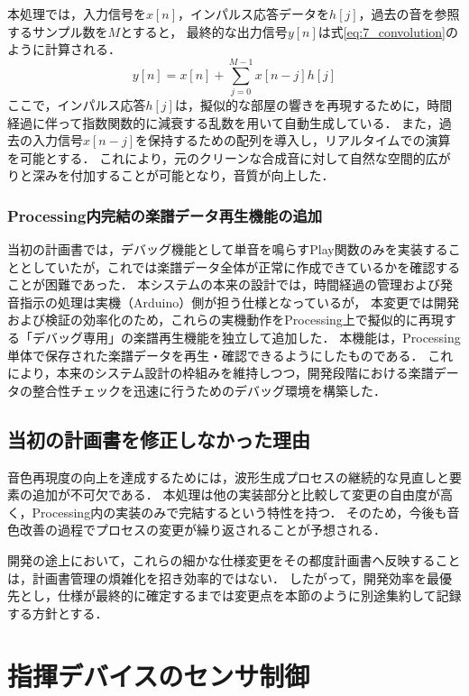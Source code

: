 \documentclass[lualatex,book,paper=a4paper,jafontsize=11.5pt,jafontscale=1.05]{jlreq}
\begin{document}
本処理では，入力信号を$x[n]$，インパルス応答データを$h[j]$，過去の音を参照するサンプル数を$M$とすると，
最終的な出力信号$y[n]$は式\ref{eq:7_convolution}のように計算される．
\begin{equation}
  y[n] = x[n] + \sum_{j=0}^{M-1} x[n-j] h[j] \label{eq:7_convolution}
\end{equation}
ここで，インパルス応答$h[j]$は，擬似的な部屋の響きを再現するために，時間経過に伴って指数関数的に減衰する乱数を用いて自動生成している．
また，過去の入力信号$x[n-j]$を保持するための配列を導入し，リアルタイムでの演算を可能とする．
これにより，元のクリーンな合成音に対して自然な空間的広がりと深みを付加することが可能となり，音質が向上した．

\subsubsection{Processing内完結の楽譜データ再生機能の追加}
当初の計画書では，デバッグ機能として単音を鳴らすPlay関数のみを実装することとしていたが，これでは楽譜データ全体が正常に作成できているかを確認することが困難であった．
本システムの本来の設計では，時間経過の管理および発音指示の処理は実機（Arduino）側が担う仕様となっているが，
本変更では開発および検証の効率化のため，これらの実機動作をProcessing上で擬似的に再現する「デバッグ専用」の楽譜再生機能を独立して追加した．
本機能は，Processing単体で保存された楽譜データを再生・確認できるようにしたものである．
これにより，本来のシステム設計の枠組みを維持しつつ，開発段階における楽譜データの整合性チェックを迅速に行うためのデバッグ環境を構築した．

\subsection{当初の計画書を修正しなかった理由}
音色再現度の向上を達成するためには，波形生成プロセスの継続的な見直しと要素の追加が不可欠である．
本処理は他の実装部分と比較して変更の自由度が高く，Processing内の実装のみで完結するという特性を持つ．
そのため，今後も音色改善の過程でプロセスの変更が繰り返されることが予想される．

開発の途上において，これらの細かな仕様変更をその都度計画書へ反映することは，計画書管理の煩雑化を招き効率的ではない．
したがって，開発効率を最優先とし，仕様が最終的に確定するまでは変更点を本節のように別途集約して記録する方針とする．

\section{指揮デバイスのセンサ制御}
\end{document}

